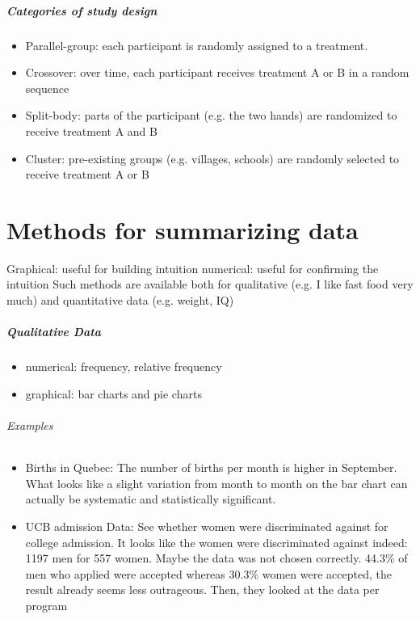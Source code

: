 \documentclass[9pt, letterpaper, oneside]{article}
\begin{document}
\paragraph{Categories of study design}
\begin{itemize}
\item Parallel-group: each participant is randomly assigned to a treatment.
\item Crossover: over time, each participant receives treatment A or B in a random sequence
\item Split-body: parts of the participant (e.g. the two hands) are randomized to receive treatment A and B
\item Cluster: pre-existing groups (e.g. villages, schools) are randomly selected to receive treatment A or B
\end{itemize}

\chapter{Methods for summarizing data}

Graphical: useful for building intuition
numerical: useful for confirming the intuition
Such methods are available both for qualitative (e.g. I like fast food very much) and quantitative data (e.g. weight, IQ)

\paragraph{Qualitative Data}
\begin{itemize}
\item numerical: frequency, relative frequency
\item graphical: bar charts and pie charts
\end{itemize}

\subparagraph{Examples}
\begin{itemize}
\item Births in Quebec: The number of births per month is higher in September. What looks like a slight variation from month to month on the bar chart can actually be systematic and statistically significant.
\item UCB admission Data: See whether women were discriminated against for college admission. It looks like the women were discriminated against indeed: 1197 men for 557 women. Maybe the data was not chosen correctly. 44.3\% of men who applied were accepted whereas 30.3\% women were accepted, the result already seems less outrageous. Then, they looked at the data per program
\end{itemize}
\end{document}
